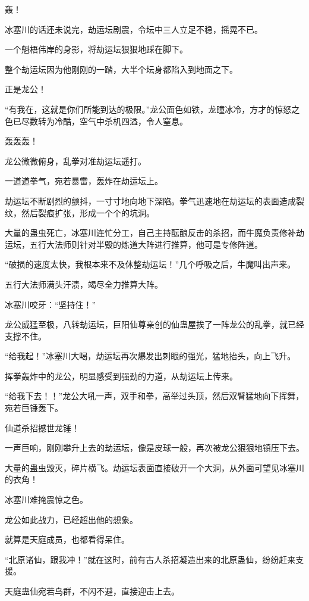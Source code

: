 \begin{this_body}
轰！

冰塞川的话还未说完，劫运坛剧震，令坛中三人立足不稳，摇晃不已。

一个魁梧伟岸的身影，将劫运坛狠狠地踩在脚下。

整个劫运坛因为他刚刚的一踏，大半个坛身都陷入到地面之下。

正是龙公！

“有我在，这就是你们所能到达的极限。”龙公面色如铁，龙瞳冰冷，方才的惊怒之色已尽数转为冷酷，空气中杀机四溢，令人窒息。

轰轰轰！

龙公微微俯身，乱拳对准劫运坛遥打。

一道道拳气，宛若暴雷，轰炸在劫运坛上。

劫运坛不断剧烈的颤抖，一寸寸地向地下深陷。拳气迅速地在劫运坛的表面造成裂纹，然后裂痕扩张，形成一个个的坑洞。

大量的蛊虫死亡，冰塞川连忙分工，自己主持酝酿反击的杀招，而牛魔负责修补劫运坛，五行大法师则针对半毁的炼道大阵进行推算，他可是专修阵道。

“破损的速度太快，我根本来不及休整劫运坛！”几个呼吸之后，牛魔叫出声来。

五行大法师满头汗渍，竭尽全力推算大阵。

冰塞川咬牙：“坚持住！”

龙公威猛至极，八转劫运坛，巨阳仙尊亲创的仙蛊屋挨了一阵龙公的乱拳，就已经支撑不住。

“给我起！”冰塞川大喝，劫运坛再次爆发出刺眼的强光，猛地抬头，向上飞升。

挥拳轰炸中的龙公，明显感受到强劲的力道，从劫运坛上传来。

“给我下去！！”龙公大吼一声，双手和拳，高举过头顶，然后双臂猛地向下挥舞，宛若巨锤轰下。

仙道杀招撼世龙锤！

一声巨响，刚刚攀升上去的劫运坛，像是皮球一般，再次被龙公狠狠地镇压下去。

大量的蛊虫毁灭，碎片横飞。劫运坛表面直接破开一个大洞，从外面可望见冰塞川的衣角！

冰塞川难掩震惊之色。

龙公如此战力，已经超出他的想象。

就算是天庭成员，也都看得呆住。

“北原诸仙，跟我冲！”就在这时，前有古人杀招凝造出来的北原蛊仙，纷纷赶来支援。

天庭蛊仙宛若鸟群，不闪不避，直接迎击上去。


\end{this_body}
